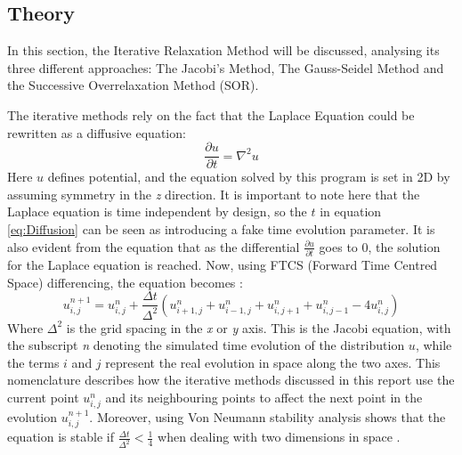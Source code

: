 \documentclass[a4paper]{article}
\begin{document}
\subsection{Theory}\label{theory}
In this section, the Iterative Relaxation Method will be discussed, analysing 
its three different approaches: The Jacobi's Method, The Gauss-Seidel Method 
and the Successive Overrelaxation Method (SOR). 

The iterative methods rely on the fact that the Laplace Equation could be 
rewritten as a diffusive equation: \cite{NR}
\begin{equation}
\frac{\partial u}{\partial t}=\nabla^2u
\label{eq:Diffusion}
\end{equation}
Here $u$ defines potential, and the equation solved by this program is set in 
2D by assuming symmetry in the \textit{z} direction. It is important to note 
here that the Laplace equation is time independent by design, so the $t$ in 
equation \ref{eq:Diffusion} can be seen as introducing a fake time evolution
parameter. It is also evident from the equation that as the differential
$\frac{ \partial u}{\partial t}$ goes to 0, the solution for the Laplace
equation is reached. Now, using FTCS (Forward Time Centred Space) differencing,
the equation becomes \cite{NR}: 
\begin{equation}
u^{n+1}_{i,j}=u^n_{i,j}+\frac{\Delta 
t}{\Delta^2}(u^n_{i+1,j}+u^n_{i-1,j}+u^n_{i,j+1}+u^n_{i,j-1}-4u^n_{i,j})
\label{eq:FTCS}
\end{equation}
Where $\Delta ^2$ is the grid spacing in the \textit{x} or \textit{y} axis. 
This is the Jacobi equation, with the subscript \textit{n} denoting the 
simulated time evolution of the distribution $u$, while the terms $i$ and $j$ 
represent the real evolution in space along the two axes. This nomenclature 
describes how the iterative methods discussed in this report use the current 
point $u^{n}_{i,j}$ and its neighbouring points to affect the next point in the 
evolution $u^{n+1}_{i,j}$. Moreover, using Von Neumann stability analysis shows 
that the equation is stable if $\frac{\Delta t}{\Delta^2}<\frac{1}{4}$ when 
dealing with two dimensions in space \cite{matrixcomp} \cite{NR}.
\end{document}
